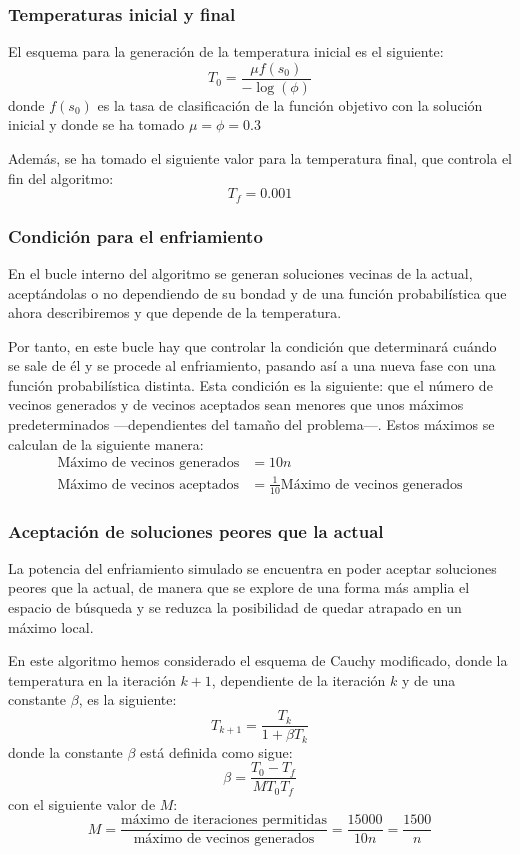 \documentclass[a4paper, 11pt, titlepage]{article}
\begin{document}
    \subsubsection*{Temperaturas inicial y final}

    El esquema para la generación de la temperatura inicial es el siguiente:
    \[
    T_0 = \frac{\mu f(s_0)}{-\log(\phi)}
    \]
    donde $f(s_0)$ es la tasa de clasificación de la función objetivo con la solución inicial y donde se ha tomado $\mu = \phi = 0.3$

    Además, se ha tomado el siguiente valor para la temperatura final, que controla el fin del algoritmo:
    \[
    T_f = 0.001
    \]

    \subsubsection*{Condición para el enfriamiento}

    En el bucle interno del algoritmo se generan soluciones vecinas de la actual, aceptándolas o no dependiendo de su bondad y de una función probabilística que ahora describiremos y que depende de la temperatura.

    Por tanto, en este bucle hay que controlar la condición que determinará cuándo se sale de él y se procede al enfriamiento, pasando así a una nueva fase con una función probabilística distinta. Esta condición es la siguiente: que el número de vecinos generados y de vecinos aceptados sean menores que unos máximos predeterminados ---dependientes del tamaño del problema---. Estos máximos se calculan de la siguiente manera:
    \begin{align*}
        \textrm{Máximo de vecinos generados} &= 10n\\
        \textrm{Máximo de vecinos aceptados} &= \frac{1}{10} \textrm{Máximo de vecinos generados}
    \end{align*}

    \subsubsection* {Aceptación de soluciones peores que la actual}

    La potencia del enfriamiento simulado se encuentra en poder aceptar soluciones peores que la actual, de manera que se explore de una forma más amplia el espacio de búsqueda y se reduzca la posibilidad de quedar atrapado en un máximo local.

    En este algoritmo hemos considerado el esquema de Cauchy modificado, donde la temperatura en la iteración $k+1$, dependiente de la iteración $k$ y de una constante $\beta$, es la siguiente:
    \[
    T_{k+1} = \frac{T_k}{1 + \beta T_k}
    \]
    donde la constante $\beta$ está definida como sigue:
    \[
    \beta = \frac{T_0 - T_f}{M T_0 T_f}
    \]
    con el siguiente valor de $M$:
    \[
    M = \frac{\textrm{máximo de iteraciones permitidas}}{\textrm{máximo de vecinos generados}} = \frac{15000}{10n} = \frac{1500}{n}
    \]
\end{document}
